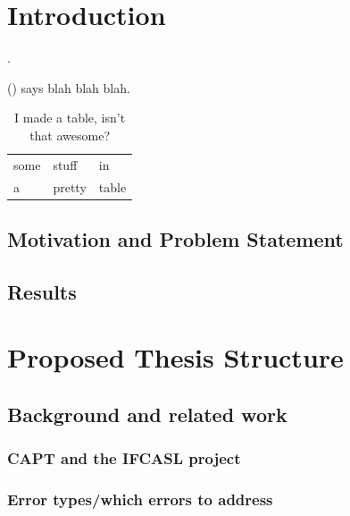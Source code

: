 %
\chapter{Introduction}
\label{chap:intro}


\blindtext \parencite{Duong2011}.

\citeauthor{Sitaram2011} (\citeyear{Sitaram2011}) says blah blah blah.

\begin{table}
\caption{I made a table, isn't that awesome?}
\begin{tabular}{lll}
some & stuff & in \\
a & pretty & table \\
\end{tabular}
\end{table}


\section{Motivation and Problem Statement}
\label{sec:intro:motivation}

\Blindtext[3][1]

\section{Results}
\label{sec:intro:results}

\Blindtext[1][2]

\chapter{Proposed Thesis Structure}
\label{chap:structure}
\blindtext 

\section{Background and related work}
\blindtext

\subsection{CAPT and the IFCASL project}
\blindtext

\subsection{Error types/which errors to address}
\blindtext

